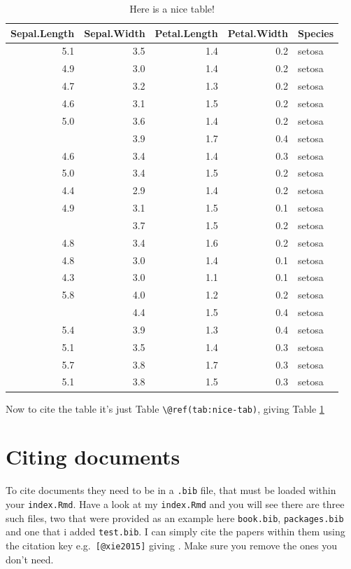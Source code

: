 \documentclass[
  12pt,
  oneside]{book}
\begin{document}
\begin{table}

\caption{\label{tab:nice-tab}Here is a nice table!}
\centering
\begin{tabular}[t]{rrrrl}
\toprule
Sepal.Length & Sepal.Width & Petal.Length & Petal.Width & Species\\
\midrule
5.1 & 3.5 & 1.4 & 0.2 & setosa\\
4.9 & 3.0 & 1.4 & 0.2 & setosa\\
4.7 & 3.2 & 1.3 & 0.2 & setosa\\
4.6 & 3.1 & 1.5 & 0.2 & setosa\\
5.0 & 3.6 & 1.4 & 0.2 & setosa\\
\addlinespace
5.4 & 3.9 & 1.7 & 0.4 & setosa\\
4.6 & 3.4 & 1.4 & 0.3 & setosa\\
5.0 & 3.4 & 1.5 & 0.2 & setosa\\
4.4 & 2.9 & 1.4 & 0.2 & setosa\\
4.9 & 3.1 & 1.5 & 0.1 & setosa\\
\addlinespace
5.4 & 3.7 & 1.5 & 0.2 & setosa\\
4.8 & 3.4 & 1.6 & 0.2 & setosa\\
4.8 & 3.0 & 1.4 & 0.1 & setosa\\
4.3 & 3.0 & 1.1 & 0.1 & setosa\\
5.8 & 4.0 & 1.2 & 0.2 & setosa\\
\addlinespace
5.7 & 4.4 & 1.5 & 0.4 & setosa\\
5.4 & 3.9 & 1.3 & 0.4 & setosa\\
5.1 & 3.5 & 1.4 & 0.3 & setosa\\
5.7 & 3.8 & 1.7 & 0.3 & setosa\\
5.1 & 3.8 & 1.5 & 0.3 & setosa\\
\bottomrule
\end{tabular}
\end{table}

Now to cite the table it's just Table \texttt{\textbackslash{}@ref(tab:nice-tab)}, giving Table \ref{tab:nice-tab}

\hypertarget{citing-documents}{%
\section{Citing documents}\label{citing-documents}}

To cite documents they need to be in a \texttt{.bib} file, that must be loaded within your \texttt{index.Rmd}. Have a look at my \texttt{index.Rmd} and you will see there are three such files, two that were provided as an example here \texttt{book.bib}, \texttt{packages.bib} and one that i added \texttt{test.bib}. I can simply cite the papers within them using the citation key e.g.~\texttt{{[}@xie2015{]}} giving \autocite{xie2015}. Make sure you remove the ones you don't need.
\end{document}

